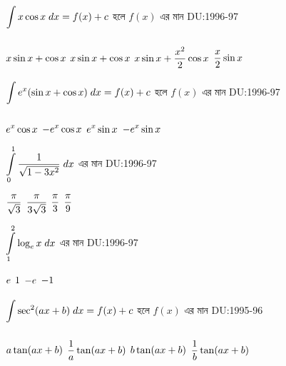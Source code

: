 \documentclass[addpoints]{exam}
\begin{document}
\begin{questions}
\begin{oneparchoices}
\end{oneparchoices}

\question  $\mathlarger{\int\limits_{}^{} x\cos x \;dx = f(x)+c}$  হলে $f(x)$ এর মান  
\hfill \textsc{DU:1996-97}

\begin{oneparchoices}

\choice $\mathlarger{x\sin x +\cos x}$
\choice $\mathlarger{x\sin x +\cos x}$
\choice $\mathlarger{x\sin x +\frac{x^2}{2}\cos x}$
\choice  $\mathlarger{\frac{x}{2}\sin x}$
\end{oneparchoices}

\question  $\mathlarger{\int\limits_{}^{} e^{x}(\sin x + \cos x) \;dx = f(x)+c}$  হলে $f(x)$ এর মান
\hfill \textsc{DU:1996-97}

\begin{oneparchoices}

\choice $\mathlarger{e^{x}\cos x}$
\choice $\mathlarger{-e^{x}\cos x}$
\choice $\mathlarger{e^{x}\sin x}$
\choice  $\mathlarger{-e^{x}\sin x}$
\end{oneparchoices}

\question  $\mathlarger{\int\limits_{0}^{1} \frac{1}{\sqrt{1-3x^2}}\;dx}$  এর মান
\hfill \textsc{DU:1996-97}

\begin{oneparchoices}

\choice $\mathlarger{\frac{\pi}{\sqrt{3}}}$
\choice $\mathlarger{\frac{\pi}{3\sqrt{3}}}$
\choice $\mathlarger{\frac{\pi}{3}}$
\choice $\mathlarger{\frac{\pi}{9}}$
\end{oneparchoices}

\question  $\mathlarger{\int\limits_{1}^{2} \log_e x\;dx}$  এর মান
\hfill \textsc{DU:1996-97}

\begin{oneparchoices}

\choice $\mathlarger{e}$
\choice $\mathlarger{1}$
\choice $\mathlarger{-e}$
\choice $\mathlarger{-1}$
\end{oneparchoices}

\question  $\mathlarger{\int\limits_{}^{} \sec^{2}(ax+b) \;dx = f(x)+c}$  হলে $f(x)$ এর মান \hfill \textsc{DU:1995-96}

\begin{oneparchoices}

\choice $\mathlarger{a\tan (ax+b)}$
\choice $\mathlarger{\frac{1}{a} \tan (ax+b)}$
\choice $\mathlarger{b\tan (ax+b)}$
\choice $\mathlarger{\frac{1}{b} \tan (ax+b)}$
\end{oneparchoices}


\end{questions}
\end{document}
